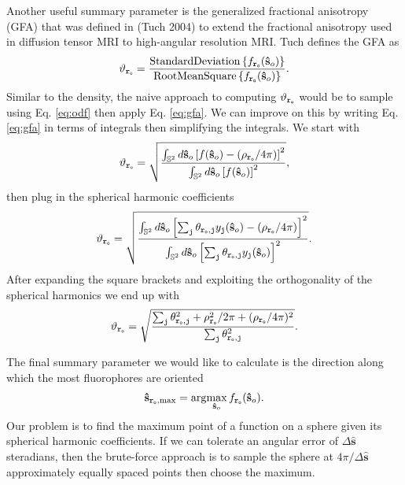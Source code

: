 \documentclass[11pt]{article}
\newcommand{\argmax}{\arg\!\max}
\providecommand{\so}{\mathbf{\hat{s}}_o}
\providecommand{\mbb}[1]{\mathbb{#1}}
\providecommand{\tb}[1]{\textbf{#1}}
\providecommand{\ttt}[1]{\texttt{#1}}
\providecommand{\ints}[1]{\int_{\mbb{S}^{#1}}}
\begin{document}
Another useful summary parameter is the generalized fractional anisotropy (GFA)
that was defined in (Tuch 2004) to extend the fractional anisotropy used in
diffusion tensor MRI to high-angular resolution MRI. Tuch defines the GFA as
\begin{align}
  \vartheta_{\ttt{\tb{r}}_{\ttt{o}}} = \frac{\text{StandardDeviation}\left\{f_{\ttt{\tb{r}}_{\ttt{o}}}(\so)\right\}}{\text{RootMeanSquare}\left\{f_{\ttt{\tb{r}}_{\ttt{o}}}(\so)\right\}}.\label{eq:gfa}
\end{align}
Similar to the density, the naive approach to computing
$\vartheta_{\ttt{\tb{r}}_{\ttt{o}}}$ would be to sample using Eq. \ref{eq:odf}
then apply Eq. \ref{eq:gfa}. We can improve on this by writing Eq. \ref{eq:gfa}
in terms of integrals then simplifying the integrals. We start with
\begin{align}
  \vartheta_{\ttt{\tb{r}}_{\ttt{o}}} = \sqrt{\frac{\ints{2}d\so\left[f(\so) - (\rho_{\ttt{\tb{r}}_{\ttt{o}}}/4\pi)\right]^2}{\ints{2}d\so\left[f(\so)\right]^2}},\\
\end{align}
then plug in the spherical harmonic coefficients
\begin{align}
  \vartheta_{\ttt{\tb{r}}_{\ttt{o}}} = \sqrt{\frac{\ints{2}d\so\left[\sum_{\ttt{j}}\theta_{\ttt{\tb{r}}_{\ttt{o}},\ttt{j}}y_{\ttt{j}}(\so) - (\rho_{\ttt{\tb{r}}_{\ttt{o}}}/4\pi)\right]^2}{\ints{2}d\so\left[\sum_{\ttt{j}} \theta_{\ttt{\tb{r}}_{\ttt{o}},\ttt{j}}y_{\ttt{j}}(\so)\right]^2}}.
\end{align}
After expanding the square brackets and exploiting the orthogonality of the
spherical harmonics we end up with
\begin{align}
  \vartheta_{\ttt{\tb{r}}_{\ttt{o}}} = \sqrt{\frac{\sum_{\ttt{j}} \theta^2_{\ttt{\tb{r}}_{\ttt{o}},\ttt{j}} + \rho^2_{\ttt{\tb{r}}_{\ttt{o}}}/2\pi + (\rho_{\ttt{\tb{r}}_{\ttt{o}}}/4\pi)^2}{\sum_{\ttt{j}} \theta^2_{\ttt{\tb{r}}_{\ttt{o}},\ttt{j}}}}.
\end{align}

The final summary parameter we would like to calculate is the direction along
which the most fluorophores are oriented
\begin{align}
  \mathbf{\hat{s}}_{\ttt{\tb{r}}_{\ttt{o}}, \text{max}} =  \argmax_{\so} f_{\ttt{\tb{r}}_{\ttt{o}}}(\so). 
\end{align}
Our problem is to find the maximum point of a function on a sphere given its
spherical harmonic coefficients. If we can tolerate an angular error of
$\Delta \mathbf{\hat{s}}$ steradians, then the brute-force approach is to sample
the sphere at $4\pi/\Delta \mathbf{\hat{s}}$ approximately equally spaced points
then choose the maximum. 
\end{document}
